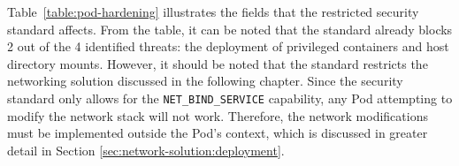 \documentclass[english, 12pt, a4paper, sci, utf8, a-2b, online]{aaltothesis}
\begin{document}


Table~\ref{table:pod-hardening} illustrates the fields that the restricted security standard affects.
From the table, it can be noted that the standard already blocks 2 out of the 4 identified threats: the deployment of privileged containers and host directory mounts.
However, it should be noted that the standard restricts the networking solution discussed in the following chapter.
Since the security standard only allows for the \lstinline{NET_BIND_SERVICE} capability, any Pod attempting to modify the network stack will not work.
Therefore, the network modifications must be implemented outside the Pod's context, which is discussed in greater detail in Section \ref{sec:network-solution:deployment}.
\end{document}
